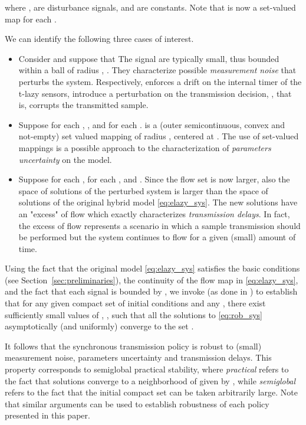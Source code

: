 \documentclass[twocolumn]{autart}
\begin{document}
{where ,  are disturbance signals, and
 are constants. Note that  
is now a set-valued map for each .

We can identify the following three cases of interest.
\begin{itemize}
\item Consider  and suppose that
The signal  are typically small, thus 
bounded within a ball of radius , . 
They characterize 
possible \emph{measurement noise} that perturbs the system. Respectively,
 enforces a drift on the internal timer of the t-lazy sensors, 
 introduce a perturbation on the transmission decision, 
, that is,  corrupts the transmitted
sample.

\item Suppose  for each , ,
and  for each . 
 is a (outer semicontinuous, convex and not-empty)
set valued mapping of radius , centered at . 
The use of set-valued mappings is a possible approach to the characterization
of \emph{parameters uncertainty} on the model.

\item Suppose  for each , 
 for each , and .
Since the flow set is now larger, also the space of solutions
of the perturbed system is larger than the
space of solutions of the original hybrid model \eqref{eq:elazy_sys}.
The new solutions have an "excess" of flow which exactly characterizes
\emph{transmission delays}. In fact, the excess of flow represents a 
scenario in which a sample transmission should be performed but the
system continues to flow for a given (small) amount of time.
\end{itemize}

Using the fact that the original model \eqref{eq:elazy_sys} satisfies
the basic conditions (see Section~\ref{sec:preliminaries}), the continuity of the flow map in \eqref{eq:elazy_sys},
and the fact that each signal  is bounded by ,
we invoke \cite[Theorem 17]{GoebelCSM09} (as done in \cite[p.57]{GoebelCSM09})
to establish that for any given compact set of initial conditions 
and any ,
there exist sufficiently small values of , ,
such that all the solutions to \eqref{eq:rob_sys}
asymptotically (and uniformly) converge to the set 
.

It follows that the synchronous transmission policy is robust to (small) measurement noise,
parameters uncertainty and transmission delays. 
This property corresponds to semiglobal practical stability, where
\emph{practical} refers to the fact that solutions converge to a neighborhood
of  given by , while \emph{semiglobal} refers
to the fact that the initial compact set  can be taken arbitrarily large.
Note that similar arguments can be used to establish robustness of each policy presented
in this paper.
}
\end{document}

